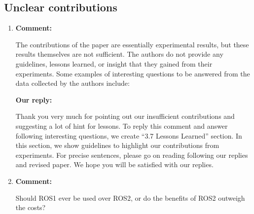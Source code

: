 \documentclass{article}
\begin{document}
\begin{enumerate}
\end{enumerate}

\subsection{Unclear contributions}
\begin{enumerate}

\item \begin{flushleft}
  \textbf{Comment:}
\end{flushleft}
  The contributions of the paper are essentially experimental results, but these results themselves are not sufficient. The authors do not provide any guidelines, lessons learned, or insight that they gained from their experiments.  Some examples of interesting questions to be answered from the data collected by the authors include:

  \begin{flushleft}
    \textbf{Our reply:}
  \end{flushleft}
  Thank you very much for pointing out our insufficient contributions and suggesting a lot of hint for lessons.
  To reply this comment and answer following interesting questions, we create ``3.7 Lessons Learned'' section.
  In this section, we show guidelines to highlight our contributions from experiments.
  For precise sentences, please go on reading following our replies and revised paper.
  We hope you will be satisfied with our replies.

\item \begin{flushleft}
  \textbf{Comment:}
\end{flushleft}
  Should ROS1 ever be used over ROS2, or do the benefits of ROS2 outweigh the costs?


\end{enumerate}
\end{document}
